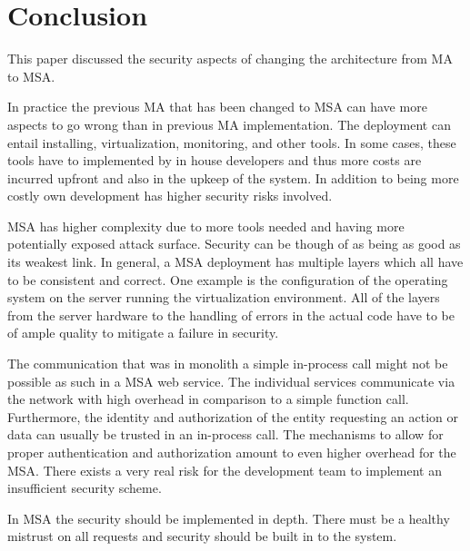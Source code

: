 

\section{Conclusion}
\begin{sloppypar}
    This paper discussed the security aspects of changing the architecture from
    MA to MSA.
\end{sloppypar}
\begin{sloppypar}
    In practice the previous MA that has been changed to MSA can have more
    aspects to go wrong than in previous MA implementation. The deployment can
    entail installing, virtualization, monitoring, and other tools. In some
    cases, these tools have to implemented by in house developers and thus more
    costs are incurred upfront and also in the upkeep of the system. In addition
    to being more costly own development has higher security risks involved.
\end{sloppypar}
\begin{sloppypar}
    MSA has higher complexity due to more tools needed and having more
    potentially exposed attack surface. Security can be though of as being as
    good as its weakest link. In general, a MSA deployment has multiple layers
    which all have to be consistent and correct. One example is the
    configuration of the operating system on the server running the
    virtualization environment. All of the layers from the server hardware to
    the handling of errors in the actual code have to be of ample quality to
    mitigate a failure in security.
\end{sloppypar}
\begin{sloppypar}
    The communication that was in monolith a simple in-process call might not be
    possible as such in a MSA web service. The individual services communicate
    via the network with high overhead in comparison to a simple function call.
    Furthermore, the identity and authorization of the entity requesting an
    action or data can usually be trusted in an in-process call. The mechanisms
    to allow for proper authentication and authorization amount to even higher
    overhead for the MSA. There exists a very real risk for the development team
    to implement an insufficient security scheme.
\end{sloppypar}
\begin{sloppypar}
    In MSA the security should be implemented in depth. There must be a healthy
    mistrust on all requests and security should be built in to the system.
\end{sloppypar}
